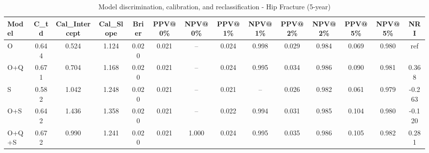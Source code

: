 \begin{table}[htbp]
\centering
\small
\caption{Model discrimination, calibration, and reclassification - Hip Fracture (5-year)}
\label{tab:perf_pd_5y}
\begin{tabular}{lccccccccccccc}
\toprule
Model & C\_td & Cal\_Intercept & Cal\_Slope & Brier & PPV@0\% & NPV@0\% & PPV@1\% & NPV@1\% & PPV@2\% & NPV@2\% & PPV@5\% & NPV@5\% & NRI \\
\midrule
O & 0.644 & 0.524 & 1.124 & 0.020 & 0.021 & -- & 0.024 & 0.998 & 0.029 & 0.984 & 0.069 & 0.980 & ref \\
O+Q & 0.671 & 0.704 & 1.168 & 0.020 & 0.021 & -- & 0.024 & 0.995 & 0.034 & 0.986 & 0.090 & 0.981 & 0.368 \\
S & 0.582 & 1.042 & 1.248 & 0.020 & 0.021 & -- & 0.021 & -- & 0.026 & 0.982 & 0.061 & 0.979 & -0.263 \\
O+S & 0.642 & 1.436 & 1.358 & 0.020 & 0.021 & -- & 0.022 & 0.994 & 0.031 & 0.985 & 0.104 & 0.980 & -0.120 \\
O+Q+S & 0.672 & 0.990 & 1.241 & 0.020 & 0.021 & 1.000 & 0.024 & 0.995 & 0.035 & 0.986 & 0.105 & 0.982 & 0.281 \\
\bottomrule
\end{tabular}
\end{table}